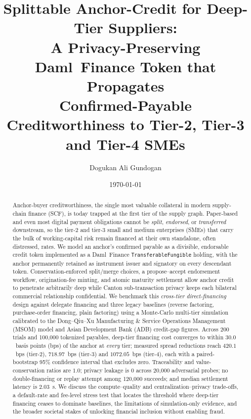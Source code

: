 \documentclass[10pt,twocolumn,letterpaper]{article}
\begin{document}
\title{Splittable Anchor-Credit for Deep-Tier Suppliers:\\
A Privacy-Preserving Daml~Finance Token that Propagates\\
Confirmed-Payable Creditworthiness to Tier-2, Tier-3 and Tier-4 SMEs}
\author{Dogukan Ali Gundogan}
\date{\today}
\maketitle

\begin{abstract}
Anchor-buyer creditworthiness, the single most valuable collateral in modern
supply-chain finance (SCF), is today trapped at the first tier of the supply
graph. Paper-based and even most digital payment obligations cannot be
\emph{split}, \emph{endorsed}, or \emph{transferred} downstream, so the tier-2 and
tier-3 small and medium enterprises (SMEs) that carry the bulk of working-capital
risk remain financed at their own standalone, often distressed, rates. We model an
anchor's confirmed payable as a divisible, endorsable credit token implemented as a
Daml~Finance \texttt{TransferableFungible} holding, with the anchor permanently
retained as instrument issuer and signatory on every descendant token. Conservation-enforced
split/merge choices, a propose--accept endorsement workflow, origination-fee
minting, and atomic maturity settlement allow anchor credit to penetrate
arbitrarily deep while Canton sub-transaction privacy keeps each bilateral
commercial relationship confidential. We benchmark this \emph{cross-tier
direct-financing} design against delegate financing and three legacy baselines
(reverse factoring, purchase-order financing, plain factoring) using a Monte-Carlo
multi-tier simulation calibrated to the Dong--Qiu--Xu Manufacturing \& Service
Operations Management (MSOM) model and Asian Development Bank (ADB) credit-gap
figures. Across 200 trials and 100{,}000 tokenized
payables, deep-tier financing cost converges to within $30.0$~basis points (bps) of the anchor at
\emph{every} tier; measured spread reductions reach $420.1$~bps (tier-2),
$718.97$~bps (tier-3) and $1072.05$~bps (tier-4), each with a paired-bootstrap 95\%
confidence interval that excludes zero. Traceability and value-conservation ratios
are $1.0$; privacy leakage is $0$ across 20{,}000 adversarial probes; no
double-financing or replay attempt among 120{,}000 succeeds; and median settlement
latency is $2.03$~s. We discuss the compute--quality and centralization--privacy
trade-offs, a default-rate and fee-level stress test that locates the threshold
where deep-tier financing ceases to dominate baselines, the limitations of
simulation-only evidence, and the broader societal stakes of unlocking financial
inclusion without enabling fraud.
\end{abstract}
\end{document}
